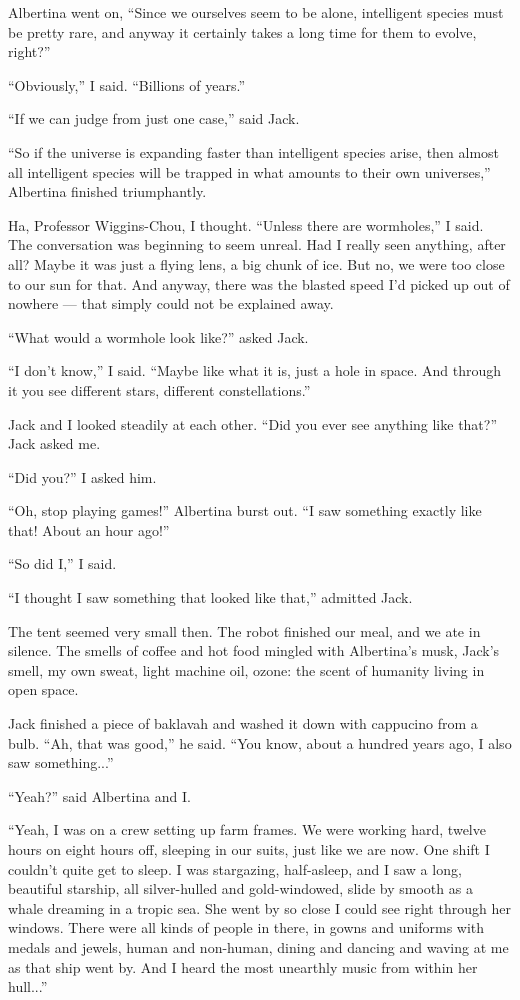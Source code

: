 \documentclass[english,11pt,letterpaper,onecolumn]{scrbook}
\begin{document}
	Albertina went on, ``Since we ourselves seem to be alone, intelligent species must be pretty rare, and anyway it certainly takes a long time for them to evolve, right?''

	``Obviously,'' I said.  ``Billions of years.''

	``If we can judge from just one case,'' said Jack.

	``So if the universe is expanding faster than intelligent species arise, then almost all intelligent species will be trapped in what amounts to their own universes,'' Albertina finished triumphantly.  

	Ha, Professor Wiggins-Chou, I thought.  ``Unless there are wormholes,'' I said.  The conversation was beginning to seem unreal.  Had I really seen anything, after all?  Maybe it was just a flying lens, a big chunk of ice.  But no, we were too close to our sun for that.  And anyway, there was the blasted speed I'd picked up out of nowhere --- that simply could not be explained away.

	``What would a wormhole look like?'' asked Jack.

	``I don't know,'' I said.  ``Maybe like what it is, just a hole in space.  And through it you see different stars, different constellations.''

	Jack and I looked steadily at each other.  ``Did you ever see anything like that?'' Jack asked me.

	``Did you?'' I asked him.

	``Oh, stop playing games!'' Albertina burst out.  ``I saw something exactly like that!  About an hour ago!''

	``So did I,'' I said.

	``I thought I saw something that looked like that,'' admitted Jack.

	The tent seemed very small then.  The robot finished our meal, and we ate in silence.  The smells of coffee and hot food mingled 
with Albertina's musk, Jack's smell, my own sweat, light machine oil, ozone:  the scent of humanity living in open space.

	Jack finished a piece of baklavah and washed it down with cappucino from a bulb.  ``Ah, that was good,'' he said.  ``You know, about a hundred years ago, I also saw something...''

	``Yeah?'' said Albertina and I.

	``Yeah, I was on a crew setting up farm frames.  We were working hard, twelve hours on eight hours off, sleeping in our suits, just like we are now.  One shift I couldn't quite get to sleep.  I was stargazing, half-asleep, and I saw a long, beautiful starship, all silver-hulled and gold-windowed, slide by smooth as a whale dreaming in a tropic sea.  She went by so close I could see right through her windows.  There were all kinds of people in there, in gowns and uniforms with medals and jewels, human and non-human, dining and dancing and waving at me as that ship went by.  And I heard the most unearthly music from within her hull...''
\end{document}
